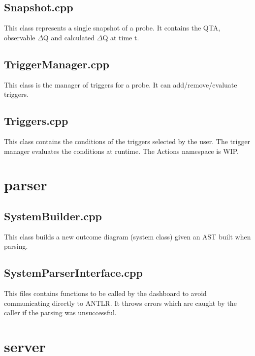 \subsection{Snapshot.cpp} \label{code:snaps}
This class represents a single snapshot of a probe. It contains the QTA, observable $\Delta$Q and calculated $\Delta$Q at time t.


\subsection{TriggerManager.cpp} \label{code:trigman}
This class is the manager of triggers for a probe. It can add/remove/evaluate triggers.


\subsection{Triggers.cpp} \label{code:trigg}
This class contains the conditions of the triggers selected by the user. The trigger manager evaluates the conditions at runtime. The Actions namespace is WIP.


\section{parser}

\subsection{SystemBuilder.cpp} \label{code:sysb}
This class builds a new outcome diagram (system class) given an AST built when parsing.


\subsection{SystemParserInterface.cpp} \label{code:syspi}
This files contains functions to be called by the dashboard to avoid communicating directly to ANTLR. It throws errors which are caught by the caller if the parsing was unsuccessful.


\section{server}

